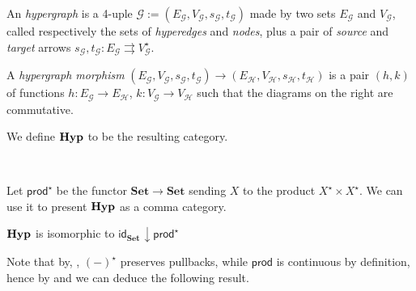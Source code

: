 \documentclass[3p]{elsarticle}
\newcommand{\Set}{\mathbf{Set}}
\def\E{\textbf {\textup{E}}}
\newcommand{\catname}[1]{\textbf{\textup{#1}}}
\newcommand{\hyp}{\catname{Hyp}}
\newcommand{\pro}{\mathsf{prod}}
\renewcommand{\comma}[2]{#1\hspace{1pt} {\downarrow}#2}
\newcommand{\id}[1]{\mathsf{id}_{#1}}
\theoremstyle{remark}
\theoremstyle{definition}
\begin{document}
\noindent
\begin{minipage}[l]{.83\linewidth}
	\setlength{\parindent}{1.5em}
	\begin{defi}An \emph{hypergraph} is a 4-uple $\mathcal{G}:=(E_\mathcal{G}, V_\mathcal{G}, s_\mathcal{G}, t_\mathcal{G})$ made by two sets $E_\mathcal{G}$ and $V_\mathcal{G}$, called respectively the sets of \emph{hyperedges} and \emph{nodes}, plus a pair of \emph{source} and \emph{target} arrows  $s_\mathcal{G}, t_\mathcal{G}\colon E_\mathcal{G}\rightrightarrows V_\mathcal{G}^\star$. 
		
A \emph{hypergraph morphism} $(E_\mathcal{G}, V_\mathcal{G}, s_\mathcal{G}, t_\mathcal{G})\to (E_\mathcal{H}, V_\mathcal{H}, s_\mathcal{H}, t_\mathcal{H})$ is a pair $(h,k)$ of functions $h\colon E_\mathcal{G}\to E_\mathcal{H}$, $k\colon V_\mathcal{G}\to V_\mathcal{H}$ such that the diagrams on the right are commutative.

We define $\hyp$ to be the resulting category.
\end{defi}\end{minipage} \hfill 
\begin{minipage}[r]{.15\linewidth}
 \hspace{1pt}\\  
\end{minipage}

Let $\pro^\star$ be the functor $\Set\to \Set$ sending $X$ to the product $X^\star\times X^\star$.  We can use it to present $\hyp$ as a comma category.

\begin{prop}\label{prop:com}
	$\hyp$ is isomorphic to $\comma{\id{\Set}}{\pro^\star}$
\end{prop}

Note that by, , $(-)^\star$ preserves pullbacks, while $\pro$ is continuous by definition, 
hence by  and  we can deduce the following result.


\end{document}
